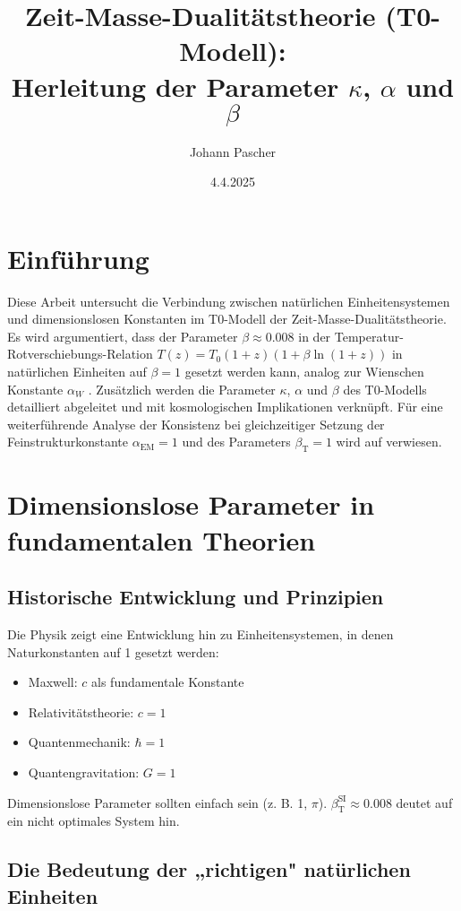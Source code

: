 \documentclass[12pt,a4paper]{article}
\title{Zeit-Masse-Dualitätstheorie (T0-Modell): \\ Herleitung der Parameter \(\kappa\), \(\alpha\) und \(\beta\)}
\author{Johann Pascher}
\date{4.4.2025}
\newcommand{\alphaEM}{\alpha_{\text{EM}}}
\newcommand{\betaT}{\beta_{\text{T}}}
\begin{document}
	
	\maketitle
	
	\section*{Einführung}
	
	Diese Arbeit untersucht die Verbindung zwischen natürlichen Einheitensystemen und dimensionslosen Konstanten im T0-Modell der Zeit-Masse-Dualitätstheorie. Es wird argumentiert, dass der Parameter \(\beta \approx 0.008\) in der Temperatur-Rotverschiebungs-Relation \(T(z) = T_0 (1+z)(1+\beta\ln(1+z))\) in natürlichen Einheiten auf \(\beta = 1\) gesetzt werden kann, analog zur Wienschen Konstante \(\alpha_W\) \cite{pascher_temp_2025}. Zusätzlich werden die Parameter \(\kappa\), \(\alpha\) und \(\beta\) des T0-Modells detailliert abgeleitet und mit kosmologischen Implikationen verknüpft. Für eine weiterführende Analyse der Konsistenz bei gleichzeitiger Setzung der Feinstrukturkonstante \(\alphaEM = 1\) und des Parameters \(\betaT = 1\) wird auf \cite{pascher_alphabeta_2025} verwiesen.
	
	\section{Dimensionslose Parameter in fundamentalen Theorien}
	
	\subsection{Historische Entwicklung und Prinzipien}
	
	Die Physik zeigt eine Entwicklung hin zu Einheitensystemen, in denen Naturkonstanten auf 1 gesetzt werden:
	\begin{itemize}
		\item Maxwell: \(c\) als fundamentale Konstante
		\item Relativitätstheorie: \(c = 1\)
		\item Quantenmechanik: \(\hbar = 1\)
		\item Quantengravitation: \(G = 1\)
	\end{itemize}
	Dimensionslose Parameter sollten einfach sein (z. B. 1, \(\pi\)). \(\betaT^{\text{SI}} \approx 0.008\) deutet auf ein nicht optimales System hin.
	
	\subsection{Die Bedeutung der „richtigen" natürlichen Einheiten}
	
\end{document}
